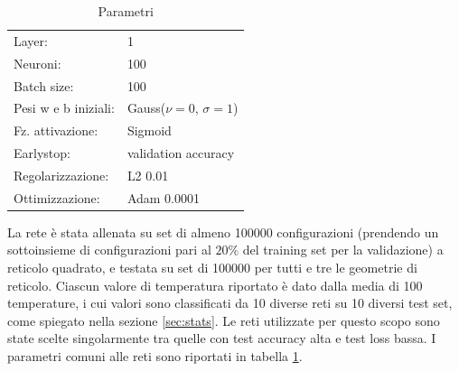 \documentclass{article}
\begin{document}
\begin{table}[ht]
\begin{center}
\begin{tabular}{ll}
\toprule
Layer: & 1\\
Neuroni: & 100 \\
Batch size: & 100\\
Pesi w e b iniziali: & Gauss($\nu=0$, $\sigma=1$)\\
Fz. attivazione: & Sigmoid\\
Earlystop: & validation accuracy \\
Regolarizzazione: & L2 0.01\\
Ottimizzazione: & Adam 0.0001 \\
\bottomrule
\end{tabular}
\end{center}
\caption{Parametri}
\label{tab:ffnnpar}
\end{table}

La rete è stata allenata su set di almeno \num{100000} configurazioni (prendendo un sottoinsieme di configurazioni pari al $20\%$ del training set per la validazione) a reticolo quadrato, e testata su set di \num{100000} per tutti e tre le geometrie di reticolo.
Ciascun valore di temperatura riportato è dato dalla media di 100 temperature, i cui valori sono classificati da 10 diverse reti su 10 diversi test set, come spiegato nella sezione \ref{sec:stats}.
Le reti utilizzate per questo scopo sono state scelte singolarmente tra quelle con test accuracy alta e test loss bassa.
I parametri comuni alle reti sono riportati in tabella \ref{tab:ffnnpar}.
\end{document}
